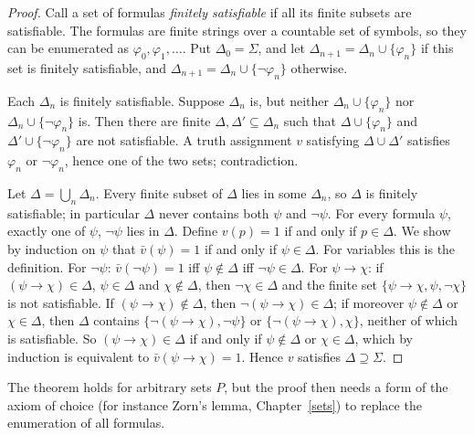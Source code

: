 \begin{proof}
Call a set of formulas \emph{finitely satisfiable} if all its finite subsets
are satisfiable. The formulas are finite strings over a countable set of
symbols, so they can be enumerated as $\varphi_0, \varphi_1, \ldots$. Put
$\Delta_0 = \Sigma$, and let $\Delta_{n+1} = \Delta_n \cup \{\varphi_n\}$ if this
set is finitely satisfiable, and $\Delta_{n+1} = \Delta_n \cup \{\neg\varphi_n\}$
otherwise.

Each $\Delta_n$ is finitely satisfiable. Suppose $\Delta_n$ is, but neither
$\Delta_n \cup \{\varphi_n\}$ nor $\Delta_n \cup \{\neg\varphi_n\}$ is. Then there
are finite $\Delta, \Delta' \subseteq \Delta_n$ such that
$\Delta \cup \{\varphi_n\}$ and $\Delta' \cup \{\neg\varphi_n\}$ are not
satisfiable. A truth assignment $v$ satisfying $\Delta \cup \Delta'$ satisfies
$\varphi_n$ or $\neg\varphi_n$, hence one of the two sets; contradiction.

Let $\Delta = \bigcup_n \Delta_n$. Every finite subset of $\Delta$ lies in some
$\Delta_n$, so $\Delta$ is finitely satisfiable; in particular $\Delta$ never
contains both $\psi$ and $\neg\psi$. For every formula $\psi$, exactly one of
$\psi$, $\neg\psi$ lies in $\Delta$. Define $v(p) = 1$ if and only if
$p \in \Delta$. We show by induction on $\psi$ that $\bar v(\psi) = 1$ if and
only if $\psi \in \Delta$. For variables this is the definition. For
$\neg\psi$: $\bar v(\neg\psi) = 1$ iff $\psi \notin \Delta$ iff
$\neg\psi \in \Delta$. For $\psi \to \chi$: if $(\psi \to \chi) \in \Delta$,
$\psi \in \Delta$ and $\chi \notin \Delta$, then $\neg\chi \in \Delta$ and the
finite set $\{\psi \to \chi, \psi, \neg\chi\}$ is not satisfiable. If
$(\psi \to \chi) \notin \Delta$, then $\neg(\psi \to \chi) \in \Delta$; if moreover
$\psi \notin \Delta$ or $\chi \in \Delta$, then $\Delta$ contains
$\{\neg(\psi \to \chi), \neg\psi\}$ or $\{\neg(\psi \to \chi), \chi\}$, neither of
which is satisfiable. So $(\psi \to \chi) \in \Delta$ if and only if
$\psi \notin \Delta$ or $\chi \in \Delta$, which by induction is equivalent to
$\bar v(\psi \to \chi) = 1$. Hence $v$ satisfies $\Delta \supseteq \Sigma$.
\end{proof}

\begin{remark}\label{logic:remark-compactness-uncountable}
The theorem holds for arbitrary sets $P$, but the proof then needs a form of
the axiom of choice (for instance Zorn's lemma, Chapter~\ref{sets}) to replace
the enumeration of all formulas.
\end{remark}

